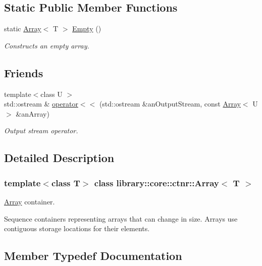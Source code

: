 \subsection*{Static Public Member Functions}
\begin{DoxyCompactItemize}
\item 
static \hyperlink{classlibrary_1_1core_1_1ctnr_1_1_array}{Array}$<$ T $>$ \hyperlink{classlibrary_1_1core_1_1ctnr_1_1_array_a7795ee997ae6008cd0bc8db607315524}{Empty} ()
\begin{DoxyCompactList}\small\item\em Constructs an empty array. \end{DoxyCompactList}\end{DoxyCompactItemize}
\subsection*{Friends}
\begin{DoxyCompactItemize}
\item 
{\footnotesize template$<$class U $>$ }\\std\+::ostream \& \hyperlink{classlibrary_1_1core_1_1ctnr_1_1_array_a9daa2d638e5bd693776f8bf6caae0802}{operator$<$$<$} (std\+::ostream \&an\+Output\+Stream, const \hyperlink{classlibrary_1_1core_1_1ctnr_1_1_array}{Array}$<$ U $>$ \&an\+Array)
\begin{DoxyCompactList}\small\item\em Output stream operator. \end{DoxyCompactList}\end{DoxyCompactItemize}


\subsection{Detailed Description}
\subsubsection*{template$<$class T$>$\newline
class library\+::core\+::ctnr\+::\+Array$<$ T $>$}

\hyperlink{classlibrary_1_1core_1_1ctnr_1_1_array}{Array} container. 

Sequence containers representing arrays that can change in size. Arrays use contiguous storage locations for their elements. 

\subsection{Member Typedef Documentation}
\mbox{\label{classlibrary_1_1core_1_1ctnr_1_1_array_ac26454f2a2ad4013873386a70aa25fc4}} 
